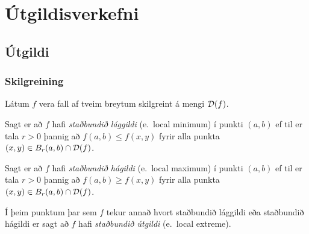 
\theoremstyle{definition}
\newtheorem{exercise}[theorem]{}





\newbox\mytempbox
\newdimen\mytempdimen

\newcommand\includegraphicscopyright[3][]{%
  \leavevmode\vbox{\vskip3pt\raggedright\setbox\mytempbox=\hbox{\texttt{[image: \#2]}}%
    \mytempdimen=\wd\mytempbox\box\mytempbox\par\vskip1pt%
    \fontsize{3}{3.5}\selectfont{\color{black!25}{\vbox{\hsize=\mytempdimen#3}}}\vskip3pt%
}}

\newenvironment{colortabular}[1]{\medskip\rowcolors[]{1}{blue!20}{blue!10}\tabular{#1}\rowcolor{blue!40}}{\endtabular\medskip}

\def\equad{\leavevmode\hbox{}\quad}

\newenvironment{greencolortabular}[1]
{\medskip\rowcolors[]{1}{green!50!black!20}{green!50!black!10}%
  \tabular{#1}\rowcolor{green!50!black!40}}%
{\endtabular\medskip}




\section{Útgildisverkefni}

\subsection{Útgildi} 

\subsubsection{Skilgreining }
 Látum $f$ vera fall af tveim breytum
skilgreint á mengi ${\cal D}(f)$.  

\medskip
Sagt er að $f$ hafi {\em \color{red}staðbundið
  lággildi} (e.~local minimum) í punkti $(a,b)$ ef til er tala $r>0$ þannig að 
$f(a,b)\leq f(x,y)$ fyrir alla punkta $(x,y)\in B_r(a,b)\cap{\cal D}(f)$.

\medskip
Sagt er að $f$ hafi {\em \color{red}staðbundið
  hágildi}  (e.~local maximum) í punkti $(a,b)$ ef til er tala $r>0$ þannig að 
$f(a,b)\geq f(x,y)$ fyrir alla punkta $(x,y)\in B_r(a,b)\cap{\cal D}(f)$.

\medskip
Í þeim punktum þar sem $f$ tekur annað hvort staðbundið lággildi eða
staðbundið hágildi er sagt að $f$ hafi {\em \color{red}staðbundið útgildi}
(e.~local extreme). 


